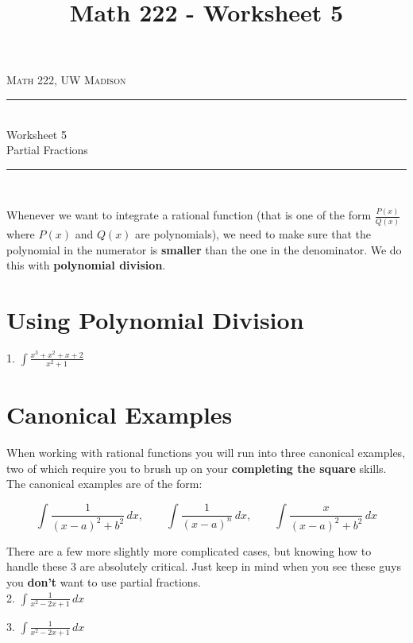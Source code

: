 \documentclass[letterpaper, fontsize=11pt]{scrartcl} %
\title{Math 222 - Worksheet 5}
\numberwithin{equation}{section} %
\numberwithin{figure}{section} %
\numberwithin{table}{section} %
\newcommand{\horrule}[1]{\rule{\linewidth}{#1}} %
\begin{document}
{
\normalfont \normalsize 
\begin{flushright}
\textsc{Math 222, UW Madison}
\end{flushright}
{\center
\horrule{0.5pt} \\[0.4cm] %
{\huge Worksheet 5}\\
Partial Fractions \\ %
\horrule{2pt} \\[0.5cm] %
}}



Whenever we want to integrate a rational function (that is one of the form $\displaystyle \frac{P(x)}{Q(x)}$ where $P(x)$ and $Q(x)$ are polynomials), we need to make sure that the polynomial in the numerator is {\bfseries smaller} than the one in the denominator.  We do this with {\bfseries polynomial division}.

\section*{Using Polynomial Division}

1. \quad $\displaystyle \int \frac{x^3 + x^2 + x + 2}{x^2 + 1}$

\vfill

\section*{Canonical Examples}
When working with rational functions you will run into three canonical examples, two of which require you to brush up on your {\bfseries completing the square} skills.  The canonical examples are of the form:

\[ \int \frac{1}{(x-a)^2 + b^2}\,dx, \qquad \int \frac{1}{(x-a)^n}\,dx, \qquad \int \frac{x}{(x - a)^2 + b^2}\,dx \]

There are a few more slightly more complicated cases, but knowing how to handle these 3 are absolutely critical.  Just keep in mind when you see these guys you {\bfseries don't} want to use partial fractions.\\

2. \quad $\displaystyle \int \frac{1}{x^2  - 2x + 1}\,dx$
\vfill

\newpage

3. \quad $\displaystyle \int \frac{1}{x^2 -2x + 1}\,dx$
\end{document}
